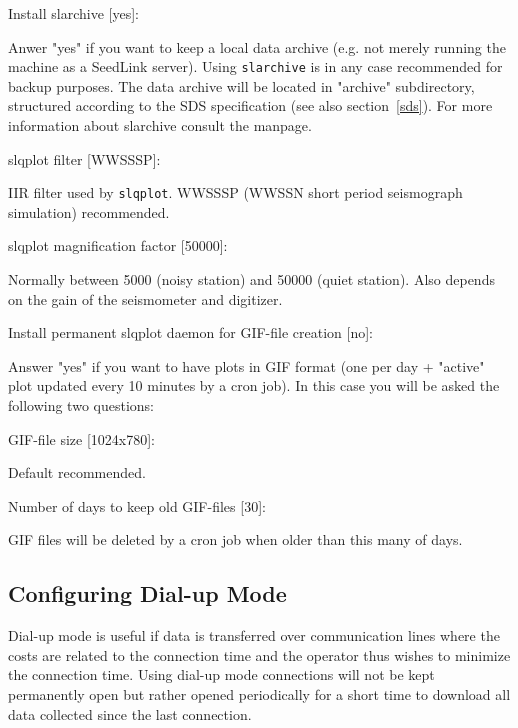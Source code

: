 \documentclass[11pt,a4paper,titlepage]{article}
\begin{document}
\begin{interface}
\item Install slarchive [yes]:

Anwer "yes" if you want to keep a local data archive (e.g. not merely
running the machine as a SeedLink server). Using \verb+slarchive+ is
in any case recommended for backup purposes. The data archive will be
located in "archive" subdirectory, structured according to the SDS
specification (see also section~\ref{sds}). For more information about
slarchive consult the manpage.

\item slqplot filter [WWSSSP]:

IIR filter used by \verb+slqplot+. WWSSSP (WWSSN short period seismograph
simulation) recommended.

\item slqplot magnification factor [50000]:

Normally between 5000 (noisy station) and 50000 (quiet station). Also
depends on the gain of the seismometer and digitizer.

\item Install permanent slqplot daemon for GIF-file creation [no]:

Answer "yes" if you want to have plots in GIF format (one per day +
"active" plot updated every 10 minutes by a cron job). In this case you
will be asked the following two questions:

\item GIF-file size [1024x780]:

Default recommended.

\item Number of days to keep old GIF-files [30]:

GIF files will be deleted by a cron job when older than this many of
days.

\end{interface}


\subsection{Configuring Dial-up Mode}\label{dialup}

Dial-up mode is useful if data is transferred over communication lines
where the costs are related to the connection time and the operator
thus wishes to minimize the connection time.  Using dial-up mode
connections will not be kept permanently open but rather opened
periodically for a short time to download all data collected since the
last connection.
\end{document}
